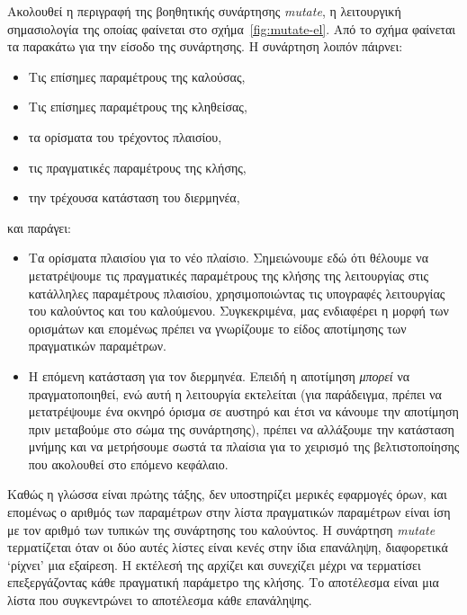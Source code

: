 \documentclass[diploma]{softlab-thesis}
\begin{document}
Ακολουθεί η περιγραφή της βοηθητικής συνάρτησης \textit{mutate}, η λειτουργική σημασιολογία 
της οποίας φαίνεται στο σχήμα~\ref{fig:mutate-el}.
Από το σχήμα φαίνεται τα παρακάτω για την είσοδο της συνάρτησης. Η συνάρτηση λοιπόν πάιρνει:
\begin{itemize}
  \item Τις επίσημες παραμέτρους της καλούσας,
  \item Τις επίσημες παραμέτρους της κληθείσας,
  \item τα ορίσματα του τρέχοντος πλαισίου,
  \item τις πραγματικές παραμέτρους της κλήσης,
  \item την τρέχουσα κατάσταση του διερμηνέα,
\end{itemize}
και παράγει:
\begin{itemize}
\item Τα ορίσματα πλαισίου για το νέο πλαίσιο. Σημειώνουμε εδώ ότι θέλουμε να μετατρέψουμε τις πραγματικές 
παραμέτρους της κλήσης της λειτουργίας στις κατάλληλες παραμέτρους πλαισίου, χρησιμοποιώντας τις υπογραφές λειτουργίας 
του καλούντος και του καλούμενου. Συγκεκριμένα, μας ενδιαφέρει η μορφή των ορισμάτων και επομένως πρέπει να 
γνωρίζουμε το είδος αποτίμησης των πραγματικών παραμέτρων.
\item Η επόμενη κατάσταση για τον διερμηνέα. Επειδή η αποτίμηση \textit{μπορεί} να πραγματοποιηθεί, 
ενώ αυτή η λειτουργία εκτελείται
(για παράδειγμα, πρέπει να μετατρέψουμε ένα οκνηρό όρισμα σε αυστηρό και έτσι να κάνουμε την αποτίμηση πριν
μεταβούμε στο σώμα της συνάρτησης), πρέπει να αλλάξουμε την κατάσταση μνήμης και να μετρήσουμε σωστά τα πλαίσια
για το χειρισμό της βελτιστοποίησης που ακολουθεί στο επόμενο κεφάλαιο.
\end{itemize}

Καθώς η γλώσσα είναι πρώτης τάξης, δεν υποστηρίζει μερικές εφαρμογές όρων, και επομένως ο αριθμός των παραμέτρων
στην λίστα πραγματικών παραμέτρων είναι ίση με τον αριθμό των τυπικών της συνάρτησης του καλούντος. Η συνάρτηση 
\textit{mutate} τερματίζεται όταν οι δύο αυτές λίστες είναι κενές στην ίδια επανάληψη, διαφορετικά `ρίχνει' μια 
εξαίρεση. Η εκτέλεσή της αρχίζει και συνεχίζει μέχρι να τερματίσει επεξεργάζοντας κάθε πραγματική παράμετρο της κλήσης. 
Το αποτέλεσμα είναι μια λίστα που συγκεντρώνει το αποτέλεσμα κάθε επανάληψης. 
\end{document}
